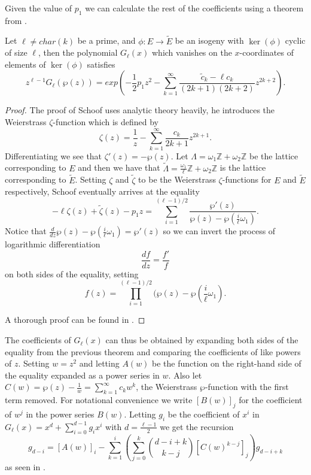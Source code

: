 Given the value of $p_1$ we can calculate the rest of the coefficients using a theorem from \cite{Schoof}.
\begin{thm}
 Let $\ell \neq char(k)$ be a prime, and $\phi: E \rightarrow \widetilde{E}$ be an isogeny with $\ker(\phi)$
cyclic of size $\ell$, then the polynomial $G_\ell(x)$ which vanishes on the $x$-coordinates of
elements of $\ker(\phi)$ satisfies
$$ z^{\ell-1}G_\ell(\wp(z)) = exp(-\frac{1}{2}p_1 z^2 - \sum_{k=1}^\infty \frac{\widetilde{c}_k-\ell c_k}{(2k+1)(2k+2)}z^{2k+2}).$$
\end{thm}
\begin{proof}
 The proof of Schoof uses analytic theory heavily, he introduces the Weierstrass $\zeta$-function
which is defined by
$$\zeta(z) = \frac{1}{z} - \sum_{k=1}^\infty \frac{c_k}{2k+1} z^{2k+1}. $$
Differentiating we see that $\zeta'(z) = - \wp(z)$. Let $\Lambda = \omega_1 \mathbb{Z}+\omega_2\mathbb{Z}$
be the lattice corresponding to $E$ and then we have that
$\widetilde{\Lambda} = \frac{\omega_1}{\ell}\mathbb{Z}+\omega_2\mathbb{Z}$ is the lattice corresponding
to $\widetilde{E}$. Setting $\zeta$ and $\widetilde{\zeta}$ to be the Weierstrass $\zeta$-functions for
$E$ and $\widetilde{E}$ respectively, Schoof eventually arrives at the equality
$$-\ell \zeta(z)+\widetilde{\zeta}(z)-p_1 z = \sum_{i=1}^{(\ell-1)/2} \frac{\wp'(z)}{\wp(z)-\wp(\frac{i}{\ell}\omega_1)}. $$
Notice that $\frac{d}{dz} \wp(z) - \wp(\frac{i}{\ell}\omega_1) = \wp'(z)$ so we can invert the process
of logarithmic differentiation
$$ \frac{df}{dz} = \frac{f'}{f}$$
on both sides of the equality, setting $$f(z) = \prod_{i=1}^{(\ell-1)/2}(\wp(z)-\wp(\frac{i}{\ell}\omega_1).$$

A thorough proof can be found in \cite{Schoof}.
\end{proof}

The coefficients of $G_\ell(x)$ can thus be obtained by expanding both sides of
the equality from the previous theorem and comparing the coefficients of like powers of $z$.
Setting $w=z^2$ and letting $A(w)$ be the function on the right-hand side of the equality
expanded as a power series in $w$. Also let $C(w) = \wp(z) - \frac{1}{w} = \sum_{k=1}^\infty c_k w^k$,
the Weierstrass $\wp$-function with the first term removed. For notational convenience we
write $[B(w)]_j$ for the coefficient of $w^j$ in the power series $B(w)$. Letting $g_i$ be the
coefficient of $x^i$ in $G_\ell(x) = x^d + \sum_{i=0}^{d-1} g_i x^i$ with $d = \frac{\ell-1}{2}$ 
we get the recursion
$$g_{d-i} = [A(w)]_i - \sum_{k=1}^i \left( \sum_{j=0}^k \binom{d-i+k}{k-j} [C(w)^{k-j}]_j \right) g_{d-i+k} $$
as seen in \cite{Blake}.

